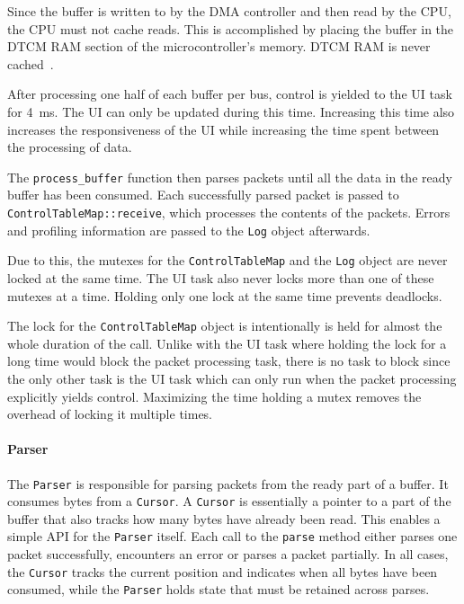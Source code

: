 Since the buffer is written to by the DMA controller and then read by the CPU, the CPU must not cache
reads. This is accomplished by placing the buffer in the DTCM RAM section of the microcontroller's
memory. DTCM RAM is never cached~\cite{mcu-ref-manual}.

After processing one half of each buffer per bus, control is yielded to the UI task for \SI{4}{\milli\second}.
The UI can only be updated during this time. Increasing this time also increases the responsiveness
of the UI while increasing the time spent between the processing of data.

The \lstinline{process_buffer} function then parses packets until all the data in the ready buffer
has been consumed. Each successfully parsed packet is passed to \lstinline{ControlTableMap::receive},
which processes the contents of the packets. Errors and profiling information are passed to the
\lstinline{Log} object afterwards.

Due to this, the mutexes for the \lstinline{ControlTableMap} and the \lstinline{Log} object are
never locked at the same time. The UI task also never locks more than one of these mutexes at a time.
Holding only one lock at the same time prevents deadlocks.

The lock for the \lstinline{ControlTableMap} object is intentionally is held for almost the whole
duration of the call. Unlike with the UI task where holding the lock for a long time would block
the packet processing task, there is no task to block since the only other task is the UI task which
can only run when the packet processing explicitly yields control. Maximizing the time holding a
mutex removes the overhead of locking it multiple times.

\paragraph{Parser}

The \lstinline{Parser} is responsible for parsing packets from the ready part of a buffer. It
consumes bytes from a \mbox{\lstinline{Cursor}.} A \lstinline{Cursor} is essentially a pointer to
a part of the buffer that also tracks how many bytes have already been read. This enables a simple
API for the \lstinline{Parser} itself. Each call to the \lstinline{parse} method either parses one
packet successfully, encounters an error or parses a packet partially. In all cases, the \lstinline{Cursor}
tracks the current position and indicates when all bytes have been consumed, while the \lstinline{Parser}
holds state that must be retained across parses.

